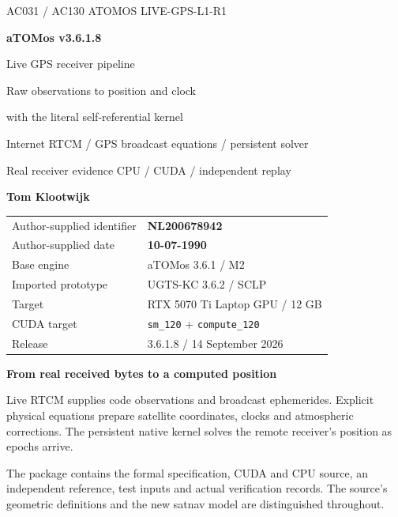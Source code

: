 \documentclass[11pt,a4paper]{article}
\newcommand{\code}[1]{\texttt{#1}}
\begin{document}
\begin{titlepage}
\thispagestyle{empty}
{\sffamily\color{accent}\large AC031 / AC130 ATOMOS \hfill LIVE-GPS-L1-R1}\par
\vspace{20mm}
{\sffamily\bfseries\fontsize{54}{60}\selectfont\color{ink}aTOMos v3.6.1.8}\par
\vspace{9mm}
{\sffamily\fontsize{25}{31}\selectfont Live GPS receiver pipeline}\par
\vspace{5mm}
{\sffamily\fontsize{21}{28}\selectfont\color{gold}Raw observations to position and clock\par
with the literal self-referential kernel}\par
\vspace{12mm}
{\large Internet RTCM / GPS broadcast equations / persistent solver\par
Real receiver evidence \;\textperiodcentered\; CPU / CUDA / independent replay}\par
\vspace{18mm}
{\sffamily\bfseries\Large Tom Klootwijk}\par
\begin{tabular}{@{}ll@{}}
Author-supplied identifier & \textbf{NL200678942}\\
Author-supplied date & \textbf{10-07-1990}\\
Base engine & aTOMos 3.6.1 / M2\\
Imported prototype & UGTS-KC 3.6.2 / SCLP\\
Target & RTX 5070 Ti Laptop GPU / 12 GB\\
CUDA target & \code{sm\_120} + \code{compute\_120}\\
Release & 3.6.1.8 / 14 September 2026\\
\end{tabular}
\vfill
\begin{panel}
\textbf{From real received bytes to a computed position}\par
Live RTCM supplies code observations and broadcast ephemerides. Explicit physical
equations prepare satellite coordinates, clocks and atmospheric corrections.
The persistent native kernel solves the remote receiver's position as epochs arrive.
\end{panel}
{\small\color{muted}The package contains the formal specification, CUDA and CPU source, an independent
reference, test inputs and actual verification records. The source's geometric definitions and the new
satnav model are distinguished throughout.}
\end{titlepage}
\setcounter{page}{2}
\end{document}

